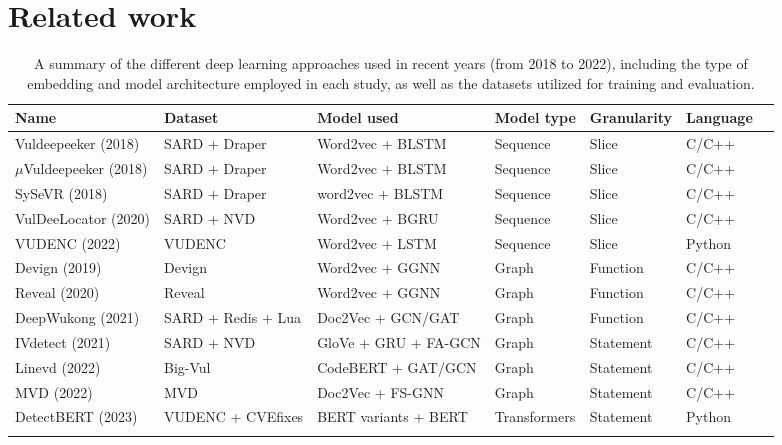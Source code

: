 \documentclass{ieeeaccess}
\begin{document}
\section{Related work}
\begin{table}[h]
\centering
\begin{tabular}{lllllll}
\Xhline{2\arrayrulewidth}
\textbf{Name} & \textbf{Dataset} &  \textbf{Model used} & \textbf{Model type} &  \textbf{Granularity} & \textbf{Language}\\ [0.5ex] 
\hline
\rowcolor{gray!15} 
Vuldeepeeker (2018)\cite{vuldeekeeper} & SARD\cite{sard} + Draper\cite{Draper} & Word2vec\cite{word2vec} + BLSTM\cite{LSTM} & Sequence & Slice & C/C++\\ 
$\mu$Vuldeepeeker (2018)\cite{vuldeekeeper} & SARD\cite{sard} + Draper\cite{Draper} & Word2vec\cite{word2vec} + BLSTM\cite{LSTM} & Sequence & Slice & C/C++\\ 
\rowcolor{gray!15} 
SySeVR (2018)\cite{SySeVR} & SARD\cite{sard} + Draper\cite{Draper} & word2vec\cite{word2vec} + BLSTM\cite{LSTM} & Sequence & Slice & C/C++ \\ 
VulDeeLocator (2020) \cite{VulDeeLocator} & SARD\cite{sard} + NVD\cite{nvd} & Word2vec\cite{word2vec} + BGRU\cite{GRU} & Sequence & Slice & C/C++\\ 
\rowcolor{gray!15} 
VUDENC (2022)\cite{VUDENC} & VUDENC\cite{VUDENC} & Word2vec\cite{word2vec} + LSTM\cite{LSTM} & Sequence & Slice & Python\\ 
Devign (2019)\cite{devign} &  Devign\cite{devign} & Word2vec\cite{word2vec} + GGNN \cite{GGNN}& Graph & Function & C/C++\\ 
\rowcolor{gray!15} 
Reveal (2020)\cite{Are} &  Reveal\cite{Are} & Word2vec\cite{word2vec} + GGNN\cite{GGNN} & Graph & Function & C/C++\\ 
DeepWukong (2021)\cite{DeepWukong} & SARD\cite{sard} + Redis + Lua &  Doc2Vec\cite{doc2vec} + GCN/GAT\cite{GCN,GAT} &  Graph & Function & C/C++\\ 
\rowcolor{gray!15} 
IVdetect (2021)\cite{IVDetect} & SARD\cite{sard} + NVD\cite{nvd} &  GloVe\cite{glove} + GRU\cite{GRU} + FA-GCN\cite{IVDetect} &  Graph & Statement & C/C++\\ 
Linevd (2022)\cite{Linevd} & Big-Vul\cite{Linevd} &  CodeBERT\cite{codebert} + GAT/GCN\cite{GCN,GAT} & Graph & Statement & C/C++\\ 
\rowcolor{gray!15} 
MVD (2022)\cite{MVD} &  MVD\cite{MVD} &  Doc2Vec\cite{doc2vec} + FS-GNN\cite{MVD} & Graph & Statement & C/C++\\ 
 DetectBERT (2023) & VUDENC\cite{VUDENC} + CVEfixes\cite{cvefixes} & BERT variants\cite{mpnet,codebert,minilm} + BERT\cite{bert} & Transformers & Statement & Python\\ 
\Xhline{2\arrayrulewidth}
\end{tabular}
\caption{A summary of the different deep learning approaches used in recent years (from 2018 to 2022), including the type of embedding and model architecture employed in each study, as well as the datasets utilized for training and evaluation.}
\label{table:related_work}
\end{table}
\end{document}
